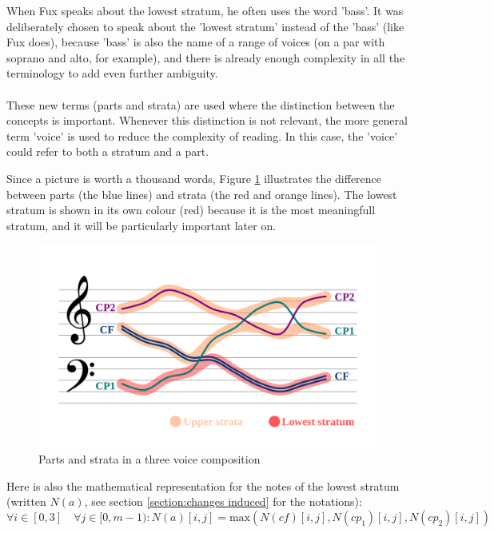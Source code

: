 When Fux speaks about the lowest stratum, he often uses the word 'bass'. It was deliberately chosen to speak about the 'lowest stratum' instead of the 'bass' (like Fux does), because 'bass' is also the name of a range of voices (on a par with soprano and alto, for example), and there is already enough complexity in all the terminology to add even further ambiguity. 

\paragraph{}
These new terms (parts and strata) are used where the distinction between the concepts is important. Whenever this distinction is not relevant, the more general term 'voice' is used to reduce the complexity of reading. In this case, the 'voice' could refer to both a stratum and a part.

Since a picture is worth a thousand words, Figure \ref{fig:lowest} illustrates the difference between parts (the blue lines) and strata (the red and orange lines). The lowest stratum is shown in its own colour (red) because it is the most meaningfull stratum, and it will be particularly important later on.

\begin{figure}[h]
  \centering
  \includegraphics[width=1\textwidth]{Images/strata_example.png}
  \caption{Parts and strata in a three voice composition}
  \label{fig:lowest}
\end{figure}


Here is also the mathematical representation for the notes of the lowest stratum (written $N(a)$, see section \ref{section:changes induced} for the notations):
\begin{equation}
    \forall i \in [0, 3] \quad \forall j \in [0, m-1): N(a)[i,j] = \text{max} (N(cf)[i,j], N(cp_1)[i,j], N(cp_2)[i,j])
\end{equation}

